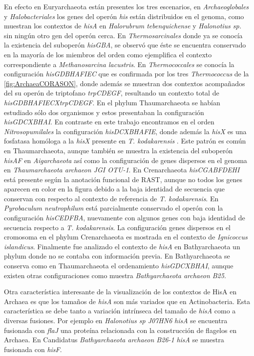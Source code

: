 \documentclass[12pt,twoside]{reedthesis}
\begin{document}
  En efecto en Euryarchaeota están presentes los tres escenarios, en
  \emph{Archaeoglobales} y \emph{Halobacteriales} los genes del operón
  \emph{his} están distribuidos en el genoma, como muestran los contextos
  de \emph{hisA} en \emph{Halorubrum tebenquichense} y \emph{Halonotius
  sp.} sin ningún otro gen del operón cerca. En \emph{Thermosarcinales}
  donde ya se conocía la existencia del suboperón \emph{hisGBA}, se
  observó que éste se encuentra conservado en la mayoría de los miembros
  del orden como ejemplifica el contexto correspondiente a
  \emph{Methanosarcina lacustris}. En \emph{Thermococcales} se conocía la
  configuración \emph{hisGDBHAFIEC} que es confirmada por los tres
  \emph{Thermococcus} de la \autoref{fig:ArchaeaCORASON}, donde además se
  muestran dos contextos acompañados del su operón de triptofano
  \emph{trpCDEGF}, resultando un contexto total de
  \emph{hisGDBHAFIECXtrpCDEGF}. En el phylum Thaumarchaeota se habían
  estudiado sólo dos organismos y estos presentaban la configuración
  \emph{hisGDCXBHAI}. En contraste en este trabajo encontramos en el orden
  \emph{Nitrosopumilales} la configuración \emph{hisDCXBHAFIE}, donde
  además la \emph{hisX} es una fosfatasa homóloga a la \emph{hisX}
  presente en \emph{T. kodakarensis} . Este patrón es común en
  Thaumarchaeota, aunque también se muestra la existencia del suboperón
  \emph{hisAF} en \emph{Aigarchaeota} así como la configuración de genes
  dispersos en el genoma en \emph{Thaumarchaeota archaeon JGI OTU-1}. En
  Crenarchaeota \emph{hisCGABFDEHI} está presente según la anotación
  funcional de RAST, aunque no todos los genes aparecen en color en la
  figura debido a la baja identidad de secuencia que conservan con
  respecto al contexto de referencia de \emph{T. kodakarensis}. En
  \emph{Pyrobaculum neutrophilum} está parcialmente conservado el operón
  con la configuración \emph{hisCEDFBA}, nuevamente con algunos genes con
  baja identidad de secuencia respecto a \emph{T. kodakarensis}. La
  configuración genes dispersos en el cromosoma en el phylum Crenarchaeota
  es mostrada en el contexto de \emph{Ignicoccus islandicus}. Finalmente
  fue analizado el contexto de \emph{hisA} en Bathyarchaeota un phylum
  donde no se contaba con información previa. En Bathyarchaeota se
  conserva como en Thaumarchaeota el ordenamiento \emph{hisGDCXBHAI},
  aunque existen otras configuraciones como muestra \emph{Bathyarchaeota
  archaeon B25}.
  
  Otra característica interesante de la visualización de los contextos de
  HisA en Archaea es que los tamaños de \emph{hisA} son más variados que
  en Actinobacteria. Esta característica se debe tanto a variación
  intrínseca del tamaño de \emph{hisA} como a diversas fusiones. Por
  ejemplo en \emph{Halonotius sp J07HN6} \emph{hisA} se encuentra
  fusionada con \emph{flaJ} una proteína relacionada con la construcción
  de flagelos en Archaea. En Candidatus \emph{Bathyarchaeota archaeon
  B26-1} \emph{hisA} se muestra fusionada con \emph{hisF}.
  
\end{document}
